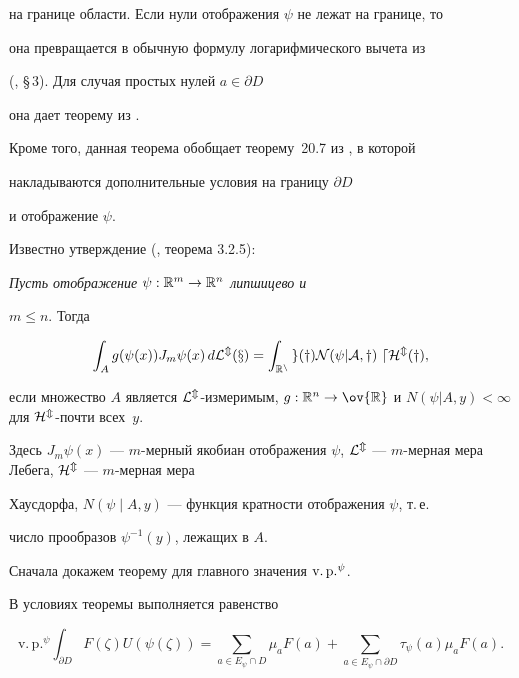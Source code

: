 на границе области. Если нули отображения $\psi$ не лежат на границе, то


она превращается в обычную формулу логарифмического вычета из


(\cite{AY}, \S\,3). Для случая простых нулей $a\in\partial D$


она дает теорему из \cite{PrTa1}.


Кроме того, данная теорема обобщает теорему~20.7 из \cite{Ky}, в которой


накладываются дополнительные условия на границу $\partial D$


и отображение $\psi$.





Известно утверждение (\cite{Fed}, теорема 3.2.5):


\medskip





{\it Пусть отображение $\psi: \Bbb R^m\to \Bbb R^n$ липшицево и


$m\le n$. Тогда


\begin{equation}\label{4f0}


\int_Ag(\psi(x))J_m\psi(x)\,d\cal L^m(x)=\int_{\Bbb R^n}g(y)


N(\psi|A,y)\ d\cal H^m(y),


\end{equation}


если множество $A$ является $\cal L^m$-измеримым, $g:\Bbb R^n\to


\ov{\Bbb R}$ и $N(\psi|A,y)<\infty$ для $\cal H^m$-почти всех~$y$.}


\medskip





Здесь $J_m\psi(x)$ --- $m$-мерный якобиан отображения $\psi$, $\cal


L^m$ --- $m$-мерная мера Лебега, $\cal H^m$ --- $m$-мерная мера


Хаусдорфа, $N(\psi\mid A,y)$ --- функция кратности отображения $\psi$, т.\,е.


число прообразов $\psi^{-1}(y)$, лежащих в $A$.





Сначала докажем теорему для главного значения $\text{v.\,p.}^\psi$.





\begin{lem}


В условиях теоремы выполняется равенство


$$


\mathrm{v.\,p.}^\psi\int_{\partial D}F(\zeta)U(\psi(\zeta))=


\sum_{a\in E_\psi\cap D}\mu_a F(a)+


\sum_{a\in E_\psi\cap\partial D}\tau_\psi(a)\mu_a F(a).


$$


\end{lem}





